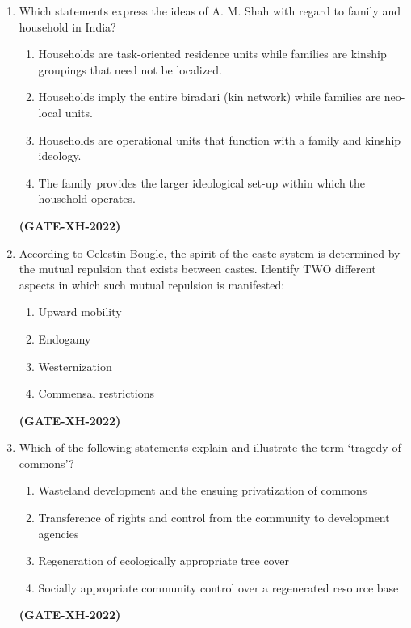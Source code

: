 \documentclass[journal]{IEEEtran}
\begin{document}
\begin{enumerate}
\item
Which statements express the ideas of A. M. Shah with regard to family and household in India?
\begin{enumerate}
\item Households are task-oriented residence units while families are kinship groupings that need not be localized.
\item Households imply the entire biradari (kin network) while families are neo-local units.
\item Households are operational units that function with a family and kinship ideology.
\item The family provides the larger ideological set-up within which the household operates.
\end{enumerate}
\hfill\textbf{(GATE-XH-2022)}

\item
According to Celestin Bougle, the spirit of the caste system is determined by the mutual repulsion that exists between castes. Identify TWO different aspects in which such mutual repulsion is manifested:
\begin{multicols}{2}
\begin{enumerate}
\item Upward mobility
\item Endogamy
\item Westernization
\item Commensal restrictions
\end{enumerate}
\end{multicols}
\hfill\textbf{(GATE-XH-2022)}

\item
Which of the following statements explain and illustrate the term ‘tragedy of commons’?
\begin{enumerate}
\item Wasteland development and the ensuing privatization of commons
\item Transference of rights and control from the community to development agencies
\item Regeneration of ecologically appropriate tree cover
\item Socially appropriate community control over a regenerated resource base
\end{enumerate}
\hfill\textbf{(GATE-XH-2022)}

\end{enumerate}
\end{document}
